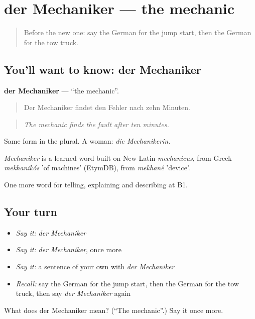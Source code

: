 \section[der Mechaniker]{der Mechaniker — the mechanic}

\label{lesson:GE-C403-mechaniker}



\begin{quote}
Before the new one: say the German for the jump start, then the German for the tow truck.
\end{quote}

\subsection*{You'll want to know: der Mechaniker}
\textbf{der Mechaniker} — \textquotedblleft{}the mechanic\textquotedblright{}.

\begin{quote}
Der Mechaniker findet den Fehler nach zehn Minuten.
\end{quote}

\begin{quote}
\emph{The mechanic finds the fault after ten minutes.}
\end{quote}

Same form in the plural. A woman: \emph{die Mechanikerin}.

\begin{cousinweb}
\emph{Mechaniker} is a learned word built on New Latin \emph{mechanicus}, from Greek \emph{mēkhanikós} 'of machines' (EtymDB), from \emph{mēkhan\'{\={e}}} 'device'.
\end{cousinweb}

\begin{grammarlens}[title={What you've built}]
One more word for telling, explaining and describing at B1.
\end{grammarlens}

\subsection*{Your turn}
\begin{itemize}
\raggedright
  \item \emph{Say it:} \emph{der Mechaniker}
  \item \emph{Say it:} \emph{der Mechaniker}, once more
  \item \emph{Say it:} a sentence of your own with \emph{der Mechaniker}
  \item \emph{Recall:} say the German for the jump start, then the German for the tow truck, then say \emph{der Mechaniker} again
\end{itemize}

\begin{tcolorbox}[breakable,colback=teal!4,colframe=teal!35!black,title={Before you move on}]
What does der Mechaniker mean? (\textquotedblleft{}The mechanic\textquotedblright{}.) Say it once more.
\end{tcolorbox}
